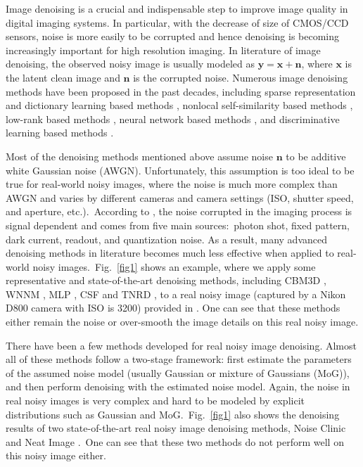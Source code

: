 \documentclass[10pt,twocolumn,letterpaper]{article}
\begin{document}
Image denoising is a crucial and indispensable step to improve image quality in digital imaging systems. In particular, with the decrease of size of CMOS/CCD sensors, noise is more easily to be corrupted and hence denoising is becoming increasingly important for high resolution imaging. In literature of image denoising, the observed noisy image is usually modeled as $\mathbf{y}=\mathbf{x}+\mathbf{n}$, where $\mathbf{x}$ is the latent clean image and $\mathbf{n}$ is the corrupted noise. Numerous image denoising methods \cite{ksvd,lssc,ncsr,nlm,bm3d,cbm3d,pgpd,wnnm,mlp,csf,chen2015learning,foe,epll} have been proposed in the past decades, including sparse representation and dictionary learning based methods \cite{ksvd,lssc,ncsr}, nonlocal self-similarity based methods \cite{ncsr,nlm,bm3d,cbm3d,pgpd}, low-rank based methods \cite{wnnm}, neural network based methods \cite{mlp}, and discriminative learning based methods \cite{csf,chen2015learning}. 

Most of the denoising methods \cite{ksvd,lssc,ncsr,nlm,bm3d,cbm3d,pgpd,wnnm,mlp,csf,chen2015learning,foe,epll} mentioned above assume noise $\mathbf{n}$ to be additive white Gaussian noise (AWGN). Unfortunately, this assumption is too ideal to be true for real-world noisy images, where the noise is much more complex than AWGN \cite{crosschannel2016,healey1994radiometric} and varies by different cameras and camera settings (ISO, shutter speed, and aperture, etc.).\ According to \cite{healey1994radiometric}, the noise corrupted in the imaging process is signal dependent and comes from five main sources:\ photon shot, fixed pattern, dark current, readout, and quantization noise. As a result, many advanced denoising methods in literature becomes much less effective when applied to real-world noisy images.\ Fig.\ \ref{fig1} shows an example, where we apply some representative and state-of-the-art denoising methods, including CBM3D \cite{cbm3d}, WNNM \cite{wnnm}, MLP \cite{mlp}, CSF \cite{csf} and TNRD \cite{chen2015learning}, to a real noisy image (captured by a Nikon D800 camera with ISO is 3200) provided in \cite{crosschannel2016}. One can see that these methods either remain the noise or over-smooth the image details on this real noisy image. 

There have been a few methods \cite{crosschannel2016,Liu2008,almapg,Zhu_2016_CVPR,noiseclinic,ncwebsite,neatimage} developed for real noisy image denoising. Almost all of these methods follow a two-stage framework: first estimate the parameters of the assumed noise model (usually Gaussian  or mixture of Gaussians (MoG)), and then perform denoising with the estimated noise model. Again, the noise in real noisy images is very complex and hard to be modeled by explicit distributions such as Gaussian and MoG.\ Fig.\ \ref{fig1} also shows the denoising results of two state-of-the-art real noisy image denoising methods, Noise Clinic \cite{noiseclinic,ncwebsite} and Neat Image \cite{neatimage}.\ One can see that these two methods do not perform well on this noisy image either. 
\end{document}
